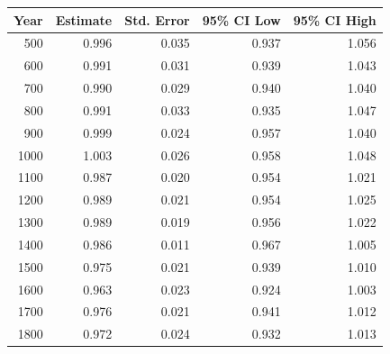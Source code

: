 
\begin{tabular}{rrrrr}
\toprule
Year & Estimate & Std. Error & 95\% CI Low & 95\% CI High\\
\midrule
500 & 0.996 & 0.035 & 0.937 & 1.056\\
600 & 0.991 & 0.031 & 0.939 & 1.043\\
700 & 0.990 & 0.029 & 0.940 & 1.040\\
800 & 0.991 & 0.033 & 0.935 & 1.047\\
900 & 0.999 & 0.024 & 0.957 & 1.040\\
1000 & 1.003 & 0.026 & 0.958 & 1.048\\
1100 & 0.987 & 0.020 & 0.954 & 1.021\\
1200 & 0.989 & 0.021 & 0.954 & 1.025\\
1300 & 0.989 & 0.019 & 0.956 & 1.022\\
1400 & 0.986 & 0.011 & 0.967 & 1.005\\
1500 & 0.975 & 0.021 & 0.939 & 1.010\\
1600 & 0.963 & 0.023 & 0.924 & 1.003\\
1700 & 0.976 & 0.021 & 0.941 & 1.012\\
1800 & 0.972 & 0.024 & 0.932 & 1.013\\
\bottomrule
\end{tabular}
